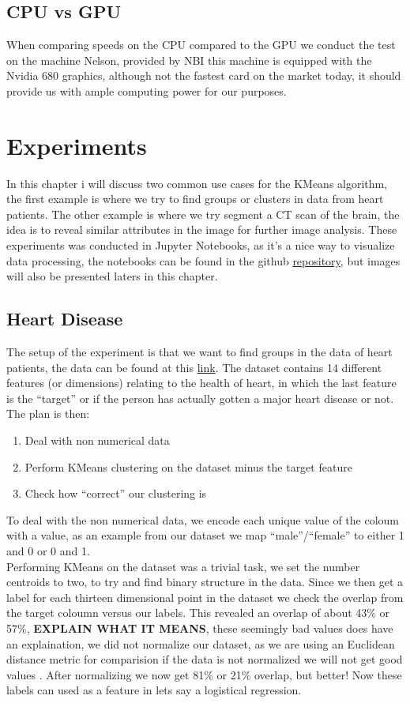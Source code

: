 \documentclass[12pt]{report}
\begin{document}
\section{CPU vs GPU}
\label{sec:cpugpu}
When comparing speeds on the CPU compared to the GPU we conduct the test on the machine Nelson, provided by NBI this machine is equipped with the Nvidia 680 graphics, although not the fastest card on the market today, it should provide us with ample computing power for our purposes.




\chapter{Experiments}
\label{sec:experi}
In this chapter i will discuss two common use cases for the KMeans algorithm, the first example is where we try to find groups or clusters in data from heart patients. The other example is where we try segment a CT scan of the brain, the idea is to reveal similar attributes in the image for further image analysis. These experiments was conducted in Jupyter Notebooks, as it's a nice way to visualize data processing, the notebooks can be found in the github \href{https://github.com/shadesfear/bachelor}{repository}, but images will also be presented laters in this chapter.
\section{Heart Disease}
\label{sec:heart}
The setup of the experiment is that we want to find groups in the data of heart patients, the data can be found at this \href{https://www.kaggle.com/ronitf/heart-disease-uci}{link}. The dataset contains 14 different features (or dimensions) relating to the health of heart, in which the last feature is the ``target'' or if the person has actually gotten a major heart disease or not. The plan is then:
\begin{enumerate}
\item Deal with non numerical data
\item Perform KMeans clustering on the dataset minus the target feature
\item Check how ``correct'' our clustering is
\end{enumerate}
To deal with the non numerical data, we encode each unique value of the coloum with a value, as an example from our dataset we map ``male''/``female'' to either 1 and 0 or 0 and 1.\\
Performing KMeans on the dataset was a trivial task, we set the number centroids to two, to try and find binary structure in the data. Since we then get a label for each thirteen dimensional point in the dataset we check the overlap from the target coloumn versus our labels. This revealed an overlap of about 43\% or 57\%, \textbf{EXPLAIN WHAT IT MEANS}, these seemingly bad values does have an explaination, we did not normalize our dataset, as we are using an Euclidean distance metric for comparision if the data is not normalized we will not get good values \cite{kmeansconvergence}. After normalizing we now get 81\% or 21\% overlap, but better! Now these labels can used as a feature in lets say a logistical regression.
\end{document}
